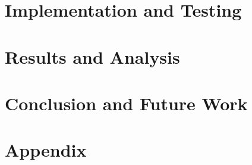 \documentclass[12pt]{report}
\begin{document}
\chapter{Implementation and Testing}


\chapter{Results and Analysis}


\chapter{Conclusion and Future Work}


\renewcommand{\bibname}{References}


\newpage
\appendix
\chapter{Appendix}

\end{document}
